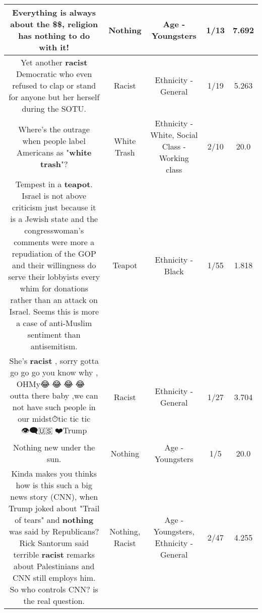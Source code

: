 \documentclass[11pt]{article}
\newlength\mylength
\begin{document}
\begin{center}
\begin{longtable}{|C{.65\mylength}|C{.30\mylength}|C{.12\mylength}|C{.12\mylength}|C{.12\mylength}|}
  \small Everything is always about the \$\$, religion has \textbf{nothing} to do with it!\normalsize   & Nothing & Age - Youngsters & 1/13 & 7.692 \\  \hline
  \small Yet another \textbf{racist} Democratic who even refused to clap or stand for anyone but her herself during the SOTU.\normalsize   & Racist & Ethnicity - General & 1/19 & 5.263 \\  \hline
  \small Where's the outrage when people label Americans as "\textbf{w\textbf{hite trash}}"?\normalsize   & White Trash & Ethnicity - White, Social Class - Working class & 2/10 & 20.0 \\  \hline
  \small Tempest in a \textbf{teapot}. Israel is not above criticism just because it is a Jewish state and the congresswoman's comments were more a repudiation of the GOP and their willingness do serve their lobbyists every whim for donations rather than an attack on Israel.  Seems this is more a case of anti-Muslim sentiment than antisemitism.\normalsize   & Teapot & Ethnicity - Black & 1/55 & 1.818 \\  \hline
  \small She's \textbf{racist} , sorry gotta go go go you know why , OHMy😂🤣😂🤣😂🤣😂🤣👍🏻outta there baby ,we can not have such people in our midst⏱tic tic tic 👁‍🗨🇺🇸🦅❤️Trump\normalsize   & Racist & Ethnicity - General & 1/27 & 3.704 \\  \hline
  \small Nothing new under the sun.\normalsize   & Nothing & Age - Youngsters & 1/5 & 20.0 \\  \hline
  \small Kinda makes you thinks how is this such a big news story (CNN), when Trump joked about "Trail of tears" and \textbf{nothing} was said by Republicans?Rick Santorum said terrible \textbf{racist} remarks about Palestinians and CNN still employs him. So who controls CNN? is the real question.\normalsize   & Nothing, Racist & Age - Youngsters, Ethnicity - General & 2/47 & 4.255 \\  \hline

\end{longtable}
\end{center}
\end{document}
